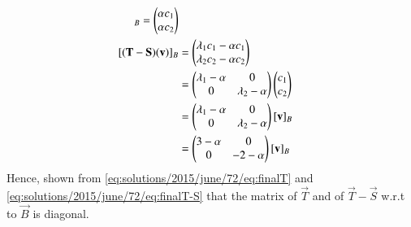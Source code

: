 \begin{align}
    [\vec{S}(\vec{v})]_B = \myvec{\alpha c_1\\ \alpha c_2}\\
    [(\vec{T}-\vec{S})(\vec{v})]_B & = \myvec{\lambda_1 c_1 -\alpha c_1 \\ \lambda_2 c_2 -\alpha c_2}\\ & = \myvec{\lambda_1 -\alpha & 0 \\ 0 & \lambda_2 - \alpha}\myvec{c_1 \\ c_2}\\ &
    = \myvec{\lambda_1 -\alpha & 0 \\ 0 & \lambda_2 - \alpha}[\vec{v}]_B \\ & = \myvec{3 -\alpha & 0 \\ 0 & -2 - \alpha}[\vec{v}]_B \label{eq:solutions/2015/june/72/eq:finalT-S}
\end{align}
Hence, shown from \eqref{eq:solutions/2015/june/72/eq:finalT} and \eqref{eq:solutions/2015/june/72/eq:finalT-S} that the matrix of $\vec{T}$ and of $\vec{T}-\vec{S}$ w.r.t to $\vec{B}$ is diagonal.
